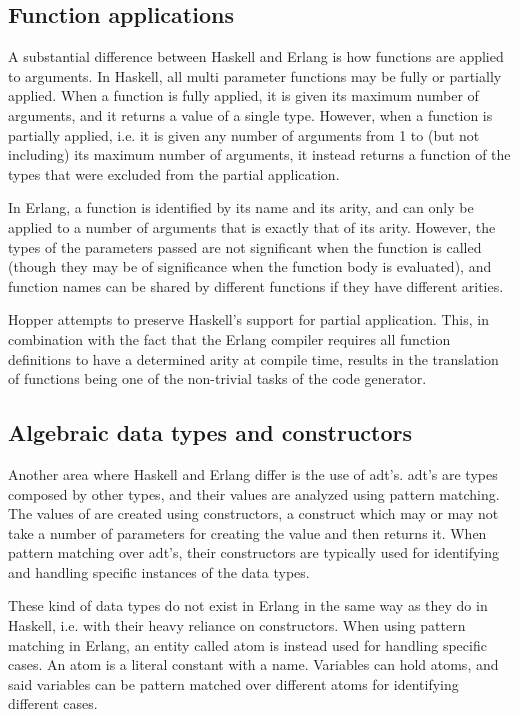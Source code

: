 \subsection{Function applications}

A substantial difference between Haskell and Erlang is how functions are applied to arguments. In Haskell, all multi parameter functions may be fully or partially applied. When a function is fully applied, it is given its maximum number of arguments, and it returns a value of a single type. However, when a function is partially applied, i.e. it is given any number of arguments from 1 to (but not including) its maximum number of arguments, it instead returns a function of the types that were excluded from the partial application.

In Erlang, a function is identified by its name and its arity, and can only be applied to a number of arguments that is exactly that of its arity. However, the types of the parameters passed are not significant when the function is called (though they may be of significance when the function body is evaluated), and function names can be shared by different functions if they have different arities.

Hopper attempts to preserve Haskell's support for partial application. This, in combination with the fact that the Erlang compiler requires all function definitions to have a determined arity at compile time, results in the translation of functions being one of the non-trivial tasks of the code generator.


\subsection{Algebraic data types and constructors}

Another area where Haskell and Erlang differ is the use of \gls{adt}'s. \gls{adt}'s are types 
composed by other types, and their values are analyzed using pattern matching. The values of are created using constructors, a construct which may or may not take a number
of parameters for creating the value and then returns it. When pattern matching over \gls{adt}'s, their
constructors are typically used for identifying and handling specific instances of the data types.

These kind of data types do not exist in Erlang in the same way as they do in Haskell, i.e. with their heavy reliance
on constructors. When using pattern matching in Erlang, an entity called atom is instead used for
handling specific cases. An atom is a literal constant with a name. Variables can hold atoms, and said
variables can be pattern matched over different atoms for identifying different cases.

